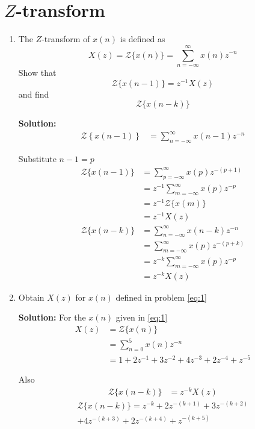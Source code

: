 \documentclass[journal,12pt,twocolumn]{IEEEtran}
\newcommand{\solution}{\noindent \textbf{Solution: }}
\providecommand{\brak}[1]{\ensuremath{\left(#1\right)}}
\providecommand{\cbrak}[1]{\ensuremath{\left\{#1\right\}}}
\providecommand{\z}[1]{{\mathcal{Z}}\{#1\}}
\numberwithin{equation}{section}
\renewcommand\thesection{\arabic{section}}
\begin{document}
	\section{$Z$-transform}
	\begin{enumerate}[label=\thesection.\arabic*]
	\item The $Z$-transform of $x\brak{n}$ is defined as
	\begin{equation}
		X\brak{z}=\z{x\brak{n}}=\sum _{n=-\infty }^{\infty }x(n)z^{-n}
	\end{equation}
	Show that
	\begin{equation}
		\z{x\brak{n-1}} = z^{-1}X\brak{z}
	\end{equation}
	and find
	\begin{equation}
		\z{x\brak{n-k}}
	\end{equation}
	
	\solution 
	\begin{align}
		{\mathcal{Z}}\cbrak{x\brak{n-1}} &= \sum _{n=-\infty }^{\infty }x\brak{n-1}z^{-n} 
	\end{align}
	
	Substitute $n - 1 = p$
	\begin{align}
		{\mathcal {Z}}\{x(n-1)\} &=  \sum _{p=-\infty }^{\infty }x(p)z^{-(p+1)} \\
		&= z^{-1} \sum _{m=-\infty }^{\infty }x(p)z^{-p} \\
		&= z^{-1} {\mathcal {Z}}\{x(m)\} \\	
		&= z^{-1} X(z) \\
		{\mathcal {Z}}\{x(n-k)\} &=  \sum _{n=-\infty }^{\infty }x(n - k)z^{-n} \\
		&=  \sum _{m=-\infty }^{\infty }x(p)z^{-(p+k)} \\
		&= z^{-k} \sum _{m=-\infty }^{\infty }x(p)z^{-p} \\
		&= z^{-k} X(z)
	\end{align}
	
	\item Obtain $X(z)$ for $x(n)$ defined in problem \ref{eq:1}
	
	\solution For the $x(n)$ given in \eqref{eq:1}
	\begin{align}
		X(z) &= \z{x(n)} \\
		&= \sum _{n=0}^{5}x(n)z^{-n} \\
		&= 1 + 2z^{-1} + 3z^{-2} + 4z^{-3} + 2z^{-4} + z^{-5}
	\end{align}
	
	Also
	\begin{align}
		\z{x(n-k)} &= z^{-k} X(z)
	\end{align}
	\begin{multline}
		\z{x(n-k)} = z^{-k} + 2z^{-(k+1)} + 3z^{-(k+2)} \\+ 4z^{-(k+3)} + 2z^{-(k+4)} + z^{-(k+5)}
	\end{multline}
	

\end{enumerate}
\end{document}
